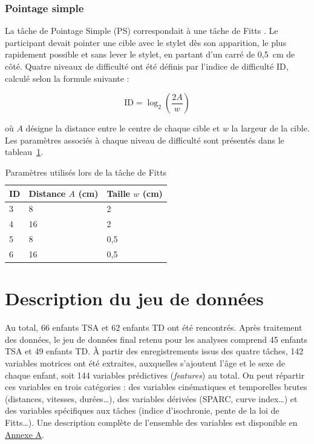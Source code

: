 \subsubsection{Pointage simple}

La tâche de Pointage Simple (PS) correspondait à une tâche de Fitts \parencite{Fitts1954}. Le participant devait pointer une cible avec le stylet dès son apparition, le plus rapidement possible et sans lever le stylet, en partant d'un carré de 0,5~cm de côté. Quatre niveaux de difficulté ont été définis par l'indice de difficulté ID, calculé selon la formule suivante :

\[
\text{ID} = \log_2\!\left(\frac{2A}{w}\right)
\]

où $A$ désigne la distance entre le centre de chaque cible et $w$ la largeur de la cible. Les paramètres associés à chaque niveau de difficulté sont présentés dans le tableau~\ref{table:IDfitts}.


\begin{table}[ht]
	\centering
	\begin{tabularx}{0.65\textwidth}{X X X}
		\hline \textbf{ID} & \textbf{Distance $A$ (cm)} & \textbf{Taille $w$ (cm)} \\ \hline
		3 & 8 & 2 \\
		4 & 16 & 2 \\
		5 & 8 & 0,5 \\
		6 & 16 & 0,5 \\ \hline
	\end{tabularx}
	\caption{Paramètres utilisés lors de la tâche de Fitts}
	\label{table:IDfitts}
\end{table}


\section{Description du jeu de données}

Au total, 66 enfants TSA et 62 enfants TD ont été rencontrés. Après traitement des données, le jeu de données final retenu pour les analyses comprend 45 enfants TSA et 49 enfants TD.
À partir des enregistrements issus des quatre tâches, 142 variables motrices ont été extraites, auxquelles s'ajoutent l'âge et le sexe de chaque enfant, soit 144 variables prédictives (\textit{features}) au total. On peut répartir ces variables en trois catégories : des variables cinématiques et temporelles brutes (distances, vitesses, durées\dots), des variables dérivées (SPARC, curve index\dots) et des variables spécifiques aux tâches (indice d'isochronie, pente de la loi de Fitts\dots). Une description complète de l'ensemble des variables est disponible en \hyperref[table:annexe_description_var]{Annexe A}.

